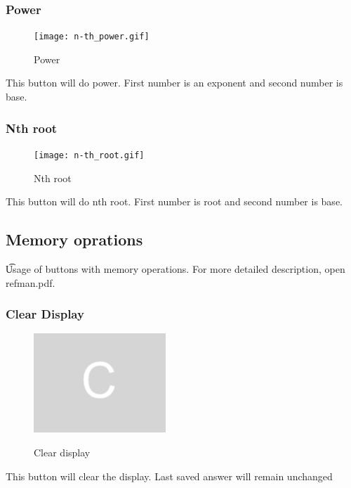 \documentclass[11pt, a4paper]{article}
\begin{document}
    \subsubsection{Power}
    \label{subsubsec:power}
        \begin{figure}[h]
            \caption{Power}
            \texttt{[image: n-th\_power.gif]}
            \centering
            \label{fig:pow}
        \end{figure}
        This button will do power. First number is an exponent and second number is base.
    \subsubsection{Nth root}
    \label{subsubsec:nthroot}
        \begin{figure}[h]
            \caption{Nth root}
            \texttt{[image: n-th\_root.gif]}
            \centering
            \label{fig:root}
        \end{figure}
        This button will do nth root. First number is root and second number is base.
    \newpage

    \subsection{Memory oprations}
    \t Usage of buttons with memory operations.
    For more detailed description, open refman.pdf.
    \label{subsec:memoryoperations}

    \subsubsection{Clear Display }

    \label{subsubsec:cleardisplay}

    \begin{figure}[h]
        \caption{Clear display}
        \includegraphics[scale = 0.2]{clear_display}
        \centering
        \label{fig:ac}
    \end{figure}
    This button will clear the display. Last saved answer will remain unchanged
\end{document}
